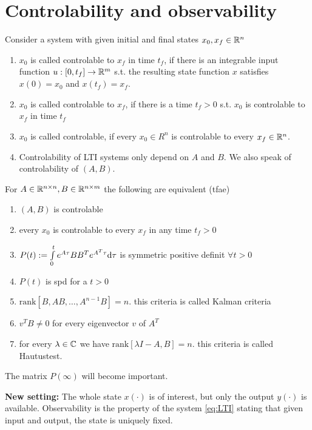 \section{Controlability and observability}

\begin{defi}
	Consider a system with given initial and final states $x_0, x_f \in \mathbb{R}^n$
	\begin{enumerate}
		\item $x_0$ is called controlable to $x_f$ in time $t_f$, if there is an integrable input function $u:[0,t_f] \rightarrow \mathbb{R}^m$ s.t. the resulting state function $x$ satisfies $x(0)=x_0$ and $x(t_f)=x_f$. 
		\item $x_0$ is called controlable to $x_f$, if there is a time $t_f>0$ s.t. $x_0$ is controlable to $x_f$ in time $t_f$
		\item $x_0$ is called controlable, if every $x_0 \in R^n$ is controlable to every $x_f \in \mathbb{R}^n$.
		\item Controlability of LTI systems only depend on $A$ and $B$. We also speak of controlability of $(A,B)$. 
	\end{enumerate}	
\end{defi}

\begin{thm}
	For $A \in \mathbb{R}^{n \times n}, B \in \mathbb{R}^{n \times m } $ the following are equivalent (tfae)
	\begin{enumerate}
		\item $(A,B)$ is controlable 
		\item every $x_0$ is controlable to every $x_f$ in any time $t_f>0$
		\item $P(t):=\int\limits_0^t e^{A \tau} B B^T e^{A^T \tau} \mathrm{d} \tau $ is symmetric positive definit $\forall t>0$
		\item $P(t)$ is spd for a $t>0$
		\item $\text{rank} [B,AB, \dots, A^{n-1}B]=n$. this criteria is called Kalman criteria
		\item $v^TB \neq 0$ for every eigenvector $v$ of $A^T$
		\item for every $\lambda \in \mathbb{C}$ we have $\text{rank}[\lambda I - A,B]=n$. this criteria is called Hautustest.  
	\end{enumerate}
\end{thm}

The matrix $P(\infty)$ will become important. 

\textbf{New setting:} The whole state $x(\cdot)$ is of interest, but only the output $y(\cdot )$ is available. Observability is the property of the system \eqref{eq:LTI} stating that given input and output, the state is uniquely fixed. 

